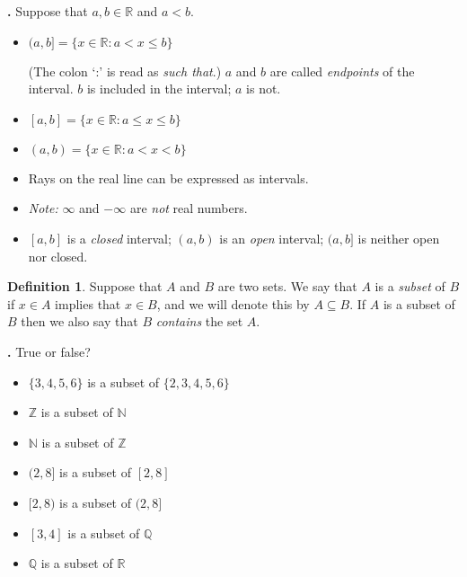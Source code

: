 \documentclass[t]{beamer}
\theoremstyle{plain}
\theoremstyle{definition}
\newtheorem{dfn}{Definition}
\newcounter{heading}
\newcommand{\newhead}[1]{\medskip\stepcounter{heading}\noindent\textbf{\hspace{0.2cm}{#1}.}}
\newcommand{\RR}{\mathbb{R}}
\newcommand{\Z}{\mathbb{Z}}
\newcommand{\N}{\mathbb{N}}
\newcommand{\Q}{\mathbb{Q}}
\begin{document}
\begin{frame}
\newhead{Intervals} Suppose that $a, b \in \RR$ and $a<b$.\pause
\begin{itemize}[<+->]
\item $(a,b]=\{x\in\RR:a<x\leq b\}$
\vspace*{.3cm}

\noindent (The colon `:' is read as \textit{such that}.) \newline
$a$ and $b$ are called \textit{endpoints} of the interval. \newline
$b$ is included in the interval; $a$ is not.

\item $[a,b]=\{x\in\RR:a\leq x\leq b\}$
\vspace*{.2cm}
\item $(a,b)=\{x\in\RR:a<x<b\}$
\vspace*{.2cm}
\item Rays on the real line can be expressed as intervals.\newline
\vspace*{.2cm}

\item \textit{Note:} $\infty$ and $-\infty$ are \textit{not} real numbers.
\item $[a,b]$ is a \textit{closed} interval; \newline
$(a,b)$ is an \textit{open} interval; \newline
$(a,b]$ is neither open nor closed.
\end{itemize}


\end{frame}

\begin{frame}

\begin{dfn} Suppose that $A$ and $B$ are two sets. We say that $A$ is a \textit{subset} of $B$ if $x\in A$ implies that $x\in B$, and we will denote this by $A \subseteq B$. If $A$ is a subset of $B$ then we also say that $B$ \textit{contains} the set $A$.\end{dfn}\pause

\vspace*{1cm}

\newhead{Example} True or false?
\begin{itemize}[<+->]
\item $\{3,4,5,6\}$ is a subset of $\{2,3,4,5,6\}$
\item $\Z$ is a subset of $\N$
\item $\N$ is a subset of $\Z$
\item $(2,8]$ is a subset of $[2,8]$
\item $[2,8)$ is a subset of $(2,8]$
\item $[3, 4]$ is a subset of $\Q$
\item $\Q$ is a subset of $\RR$
\end{itemize}

\end{frame}
\end{document}
